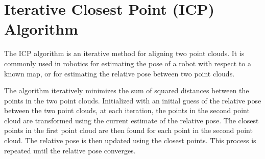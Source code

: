 




\section{Iterative Closest Point (ICP) Algorithm}
\label{sec:iterative_closest_point_algorithm}

The ICP algorithm \cite{zhang1994iterative} \cite{besl1992method} is an iterative method for aligning two point clouds. It is commonly used in robotics for estimating the pose of a robot with respect to a known map, or for estimating the relative pose between two point clouds.

The algorithm iteratively minimizes the sum of squared distances between the points in the two point clouds. Initialized with an initial guess of the relative pose between the two point clouds, at each iteration, the points in the second point cloud are transformed using the current estimate of the relative pose. The closest points in the first point cloud are then found for each point in the second point cloud. The relative pose is then updated using the closest points. This process is repeated until the relative pose converges.

